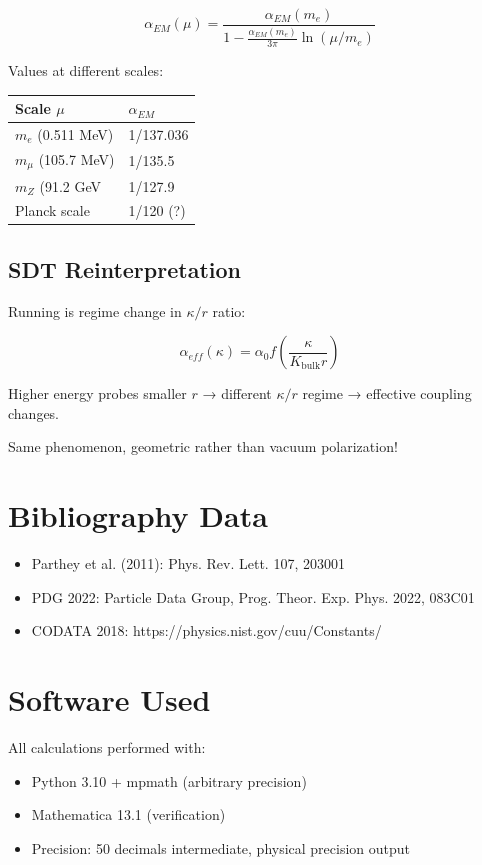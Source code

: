 \documentclass{article}
\begin{document}
\begin{equation}
\alpha_{EM}(\mu) = \frac{\alpha_{EM}(m_e)}{1 - \frac{\alpha_{EM}(m_e)}{3\pi} \ln(\mu/m_e)}
\end{equation}

Values at different scales:

\begin{longtable}{ll}
\toprule
\textbf{Scale $\mu$} & \textbf{$\alpha_{EM}$} \\
\midrule
$m_e$ (0.511 MeV) & 1/137.036 \\
$m_\mu$ (105.7 MeV) & 1/135.5 \\
$m_Z$ (91.2 GeV  & 1/127.9 \\
Planck scale & 1/120 (?) \\
\bottomrule
\end{longtable}

\subsection{SDT Reinterpretation}

Running is regime change in $\kappa/r$ ratio:

\begin{equation}
\alpha_{eff}(\kappa) = \alpha_0 f\left(\frac{\kappa}{K_{\text{bulk}}r}\right)
\end{equation}

Higher energy probes smaller $r$ → different $\kappa/r$ regime → effective coupling changes.

Same phenomenon, geometric rather than vacuum polarization!

\section{Bibliography Data}

\begin{itemize}
\item Parthey et al. (2011): Phys. Rev. Lett. 107, 203001
\item PDG 2022: Particle Data Group, Prog. Theor. Exp. Phys. 2022, 083C01
\item CODATA 2018: https://physics.nist.gov/cuu/Constants/
\end{itemize}

\section{Software Used}

All calculations performed with:
\begin{itemize}
\item Python 3.10 + mpmath (arbitrary precision)
\item Mathematica 13.1 (verification)
\item Precision: 50 decimals intermediate, physical precision output
\end{itemize}
\end{document}
